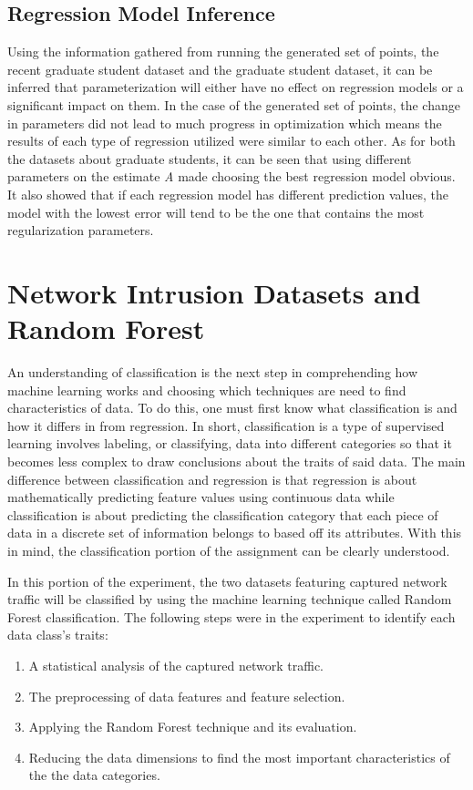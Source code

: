 \documentclass[a4paper,12pt]{IEEEtran}
\begin{document}
\subsection{Regression Model Inference}
\label{reg_summary}
Using the information gathered from running the generated set of points, the recent graduate student dataset and the graduate student dataset, it can be inferred that parameterization will either have no effect on regression models or a significant impact on them. In the case of the generated set of points, the change in parameters did not lead to much progress in optimization which means the results of each type of regression utilized were similar to each other. As for both the datasets about graduate students, it can be seen that using different parameters on the estimate \textit{A} made choosing the best regression model obvious. It also showed that if each regression model has different prediction values, the model with the lowest error will tend to be the one that contains the most regularization parameters.

\section{Network Intrusion Datasets and Random Forest}
An understanding of classification is the next step in comprehending how machine learning works and choosing which techniques are need to find characteristics of data. To do this, one must first know what classification is and how it differs in from regression. In short, classification is a type of supervised learning involves labeling, or classifying, data into different categories so that it becomes less complex to draw conclusions about the traits of said data. The main difference between classification and regression is that regression is about mathematically predicting feature values using continuous data while classification is about predicting the classification category that each piece of data in a discrete set of information belongs to based off its attributes. With this in mind, the classification portion of the assignment can be clearly understood.

In this portion of the experiment, the two datasets featuring captured network traffic will be classified by using the machine learning technique called Random Forest classification. The following steps were in the experiment to identify each data class's traits:
\begin{enumerate}
\item A statistical analysis of the captured network traffic.
\item The preprocessing of data features and feature selection.
\item Applying the Random Forest technique and its evaluation.
\item Reducing the data dimensions to find the most important characteristics of the the data categories.
\end{enumerate}
\end{document}
